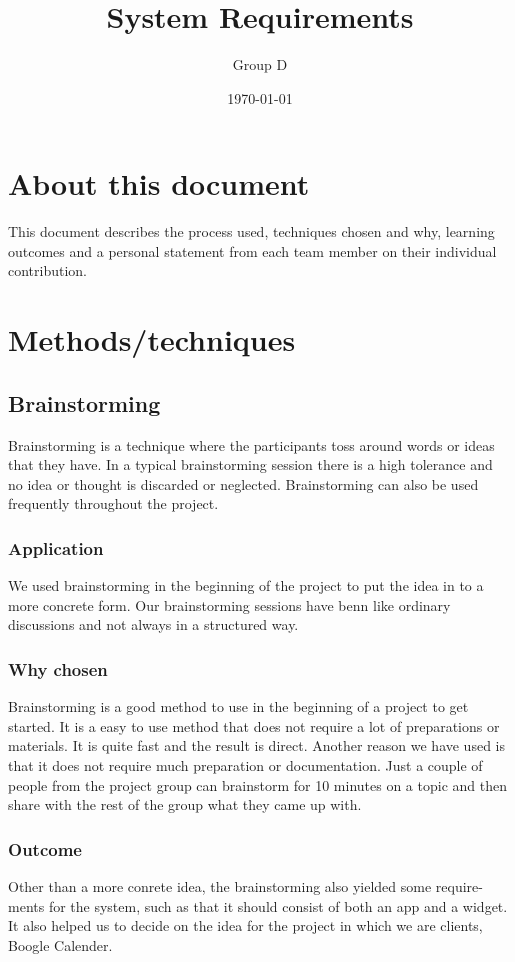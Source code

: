 \documentclass[a4paper]{article}
\title{System Requirements}
\author{Group D}
\date{\today}
\begin{document}
	\maketitle
	\thispagestyle{empty}
	\setcounter{page}{0}
	\pagebreak
	\tableofcontents
	\pagebreak
	
  \section{About this document}
  This document describes the process used, techniques chosen and why, learning
outcomes and a personal statement from each team member on their individual
contribution.
  \section{Methods/techniques}
  \subsection{Brainstorming}
Brainstorming is a technique where the participants toss around words or ideas
that they have. In a typical brainstorming session there is a high tolerance and
no idea or thought is discarded or neglected. Brainstorming can also be used
frequently throughout the project.
    \subsubsection{Application}
We used brainstorming in the beginning of the project to put the idea in to
a more concrete form. Our brainstorming sessions have benn like ordinary
discussions and not always in a structured way.
    \subsubsection{Why chosen}
Brainstorming is a good method to use in the beginning of a project to get
started. It is a easy to use method that does not require a lot of preparations or
materials. It is quite fast and the result is direct. Another reason we have used
is that it does not require much preparation or documentation. Just a couple
of people from the project group can brainstorm for 10 minutes on a topic and
then share with the rest of the group what they came up with.

    \subsubsection{Outcome}
    Other than a more conrete idea, the brainstorming also yielded some require-
ments for the system, such as that it should consist of both an app and a widget.
It also helped us to decide on the idea for the project in which we are clients,
Boogle Calender.
\end{document}
